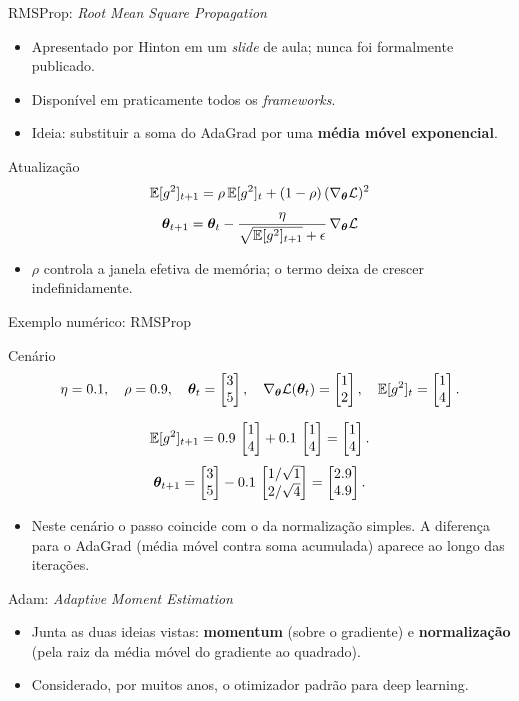 \documentclass[aspectratio=169,xcolor=dvipsnames]{beamer}
\begin{document}
  \begin{frame}{RMSProp: \textit{Root Mean Square Propagation}}
    \begin{itemize}
      \item Apresentado por Hinton em um \textit{slide} de aula; nunca foi formalmente publicado.
      \item Disponível em praticamente todos os \textit{frameworks}.
      \item Ideia: substituir a soma do AdaGrad por uma \textbf{média móvel exponencial}.
    \end{itemize}
    \vfill
    \begin{block}{Atualização}
      \[
        \mathbb{E}[g^{2}]_{t+1} = \rho\,\mathbb{E}[g^{2}]_{t} + (1-\rho)\,(\nabla_{\bm{\theta}}\mathcal{L})^{2}
      \]
      \[
        \bm{\theta}_{t+1}=\bm{\theta}_{t} - \frac{\eta}{\sqrt{\mathbb{E}[g^{2}]_{t+1}}+\epsilon}\,\nabla_{\bm{\theta}}\mathcal{L}
      \]
    \end{block}
    \begin{itemize}
      \item $\rho$ controla a janela efetiva de memória; o termo deixa de crescer indefinidamente.
    \end{itemize}
  \end{frame}

  \begin{frame}{Exemplo numérico: RMSProp}
    \begin{block}{Cenário}
      \[
        \eta=0.1,\quad \rho=0.9,\quad \bm{\theta}_t=\begin{bmatrix} 3 \\ 5 \end{bmatrix},\quad \nabla_{\bm{\theta}}\mathcal{L}(\bm{\theta}_t)=\begin{bmatrix} 1 \\ 2 \end{bmatrix},\quad \mathbb{E}[g^2]_t=\begin{bmatrix} 1 \\ 4 \end{bmatrix}.
      \]
    \end{block}
    \[
      \mathbb{E}[g^2]_{t+1} = 0.9\,\begin{bmatrix} 1 \\ 4 \end{bmatrix} + 0.1\,\begin{bmatrix} 1 \\ 4 \end{bmatrix} = \begin{bmatrix} 1 \\ 4 \end{bmatrix}.
    \]
    \[
      \bm{\theta}_{t+1} = \begin{bmatrix} 3 \\ 5 \end{bmatrix} - 0.1\,\begin{bmatrix} 1/\sqrt{1} \\ 2/\sqrt{4} \end{bmatrix} = \begin{bmatrix} 2.9 \\ 4.9 \end{bmatrix}.
    \]
    \begin{itemize}
      \item Neste cenário o passo coincide com o da normalização simples. A diferença para o AdaGrad (média móvel contra soma acumulada) aparece ao longo das iterações.
    \end{itemize}
  \end{frame}

  \begin{frame}{Adam: \textit{Adaptive Moment Estimation}}
    \begin{itemize}
      \item Junta as duas ideias vistas: \textbf{momentum} (sobre o gradiente) e
        \textbf{normalização} (pela raiz da média móvel do gradiente ao quadrado).
      \item Considerado, por muitos anos, o otimizador padrão para deep learning.
    \end{itemize}
  \end{frame}
\end{document}
